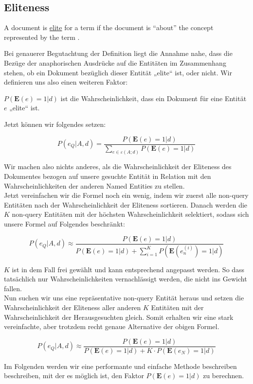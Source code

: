 \subsection{Eliteness}

\begin{defi}
	A document is \underline{elite} for a term if the document is ``about'' the concept represented by the term \cite{paper:Robertson}.
\end{defi}


Bei genauerer Begutachtung der Definition liegt die Annahme nahe, dass die Bezüge der anaphorischen Ausdrücke auf die Entitäten im Zusammenhang stehen, ob ein Dokument bezüglich dieser Entität „elite“ ist, oder nicht. Wir definieren uns also einen weiteren Faktor:

\begin{defi}
$P(\textbf{E}(e) = 1 | d)$ ist die Wahrscheinlichkeit, dass ein Dokument für eine Entität $e$ „elite“ ist.
\end{defi}

Jetzt können wir folgendes setzen:

\[ P(e_Q | A,d) = \frac{P(\textbf{E}(e) = 1 | d)}{\sum_{e \in \varepsilon (A;d)} P(\textbf{E}(e) = 1 | d)} \]

Wir machen also nichts anderes, als die Wahrscheinlichkeit der Eliteness des Dokumentes bezogen auf unsere gesuchte Entität in Relation mit den Wahrscheinlichkeiten der anderen Named Entities zu stellen.\\
Jetzt vereinfachen wir die Formel noch ein wenig, indem wir zuerst alle non-query Entitäten nach der Wahrscheinlichkeit der Eliteness sortieren. Danach werden die $K$ non-query Entitäten mit der höchsten Wahrscheinlichkeit selektiert, sodass sich unsere Formel auf Folgendes beschränkt:

\[ P(e_Q | A,d) \approx \frac{P(\textbf{E}(e) = 1 | d)}{P(\textbf{E}(e) = 1 | d) + \sum_{i=1}^{K} P(\textbf{E}(e_{n}^{(i)}) = 1 | d)} \]

$K$ ist in dem Fall frei gewählt und kann entsprechend angepasst werden. So dass tatsächlich nur Wahrscheinlichkeiten vernachlässigt werden, die nicht ins Gewicht fallen.\\
Nun suchen wir uns eine repräsentative non-query Entität heraus und setzen die Wahrscheinlichkeit der Eliteness aller anderen $K$ Entitäten mit der Wahrscheinlichkeit der Herausgesuchten gleich. Somit erhalten wir eine stark vereinfachte, aber trotzdem recht genaue Alternative der obigen Formel.

\[ P(e_Q | A,d) \approx \frac{P(\textbf{E}(e) = 1 | d)}{P(\textbf{E}(e) = 1 | d) + K \cdot P(\textbf{E}(e_N) = 1 | d)} \]


Im Folgenden werden wir eine performante und einfache Methode beschreiben beschreiben, mit der es möglich ist, den Faktor $P(\textbf{E}(e) = 1 | d)$ zu berechnen.


